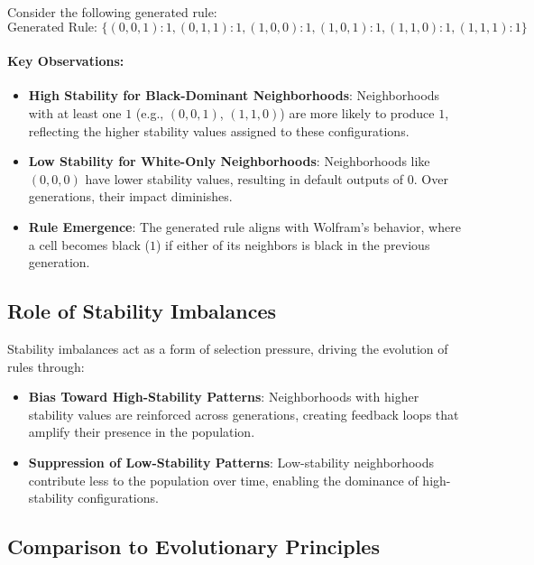 \documentclass[entropy,article,submit,pdftex,moreauthors]{Definitions/mdpi}
\begin{document}
Consider the following generated rule:
\[
\text{Generated Rule: } \{(0, 0, 1): 1, (0, 1, 1): 1, (1, 0, 0): 1, (1, 0, 1): 1, (1, 1, 0): 1, (1, 1, 1): 1\}
\]

\paragraph{Key Observations:}
\begin{itemize}
    \item \textbf{High Stability for Black-Dominant Neighborhoods}: Neighborhoods with at least one \(1\) (e.g., \((0, 0, 1)\), \((1, 1, 0)\)) are more likely to produce \(1\), reflecting the higher stability values assigned to these configurations.
    \item \textbf{Low Stability for White-Only Neighborhoods}: Neighborhoods like \((0, 0, 0)\) have lower stability values, resulting in default outputs of \(0\). Over generations, their impact diminishes.
    \item \textbf{Rule Emergence}: The generated rule aligns with Wolfram’s behavior, where a cell becomes black (\(1\)) if either of its neighbors is black in the previous generation.
\end{itemize}

\subsection{Role of Stability Imbalances}

Stability imbalances act as a form of selection pressure, driving the evolution of rules through:
\begin{itemize}
    \item \textbf{Bias Toward High-Stability Patterns}: Neighborhoods with higher stability values are reinforced across generations, creating feedback loops that amplify their presence in the population.
    \item \textbf{Suppression of Low-Stability Patterns}: Low-stability neighborhoods contribute less to the population over time, enabling the dominance of high-stability configurations.
\end{itemize}

\subsection{Comparison to Evolutionary Principles}
\end{document}
